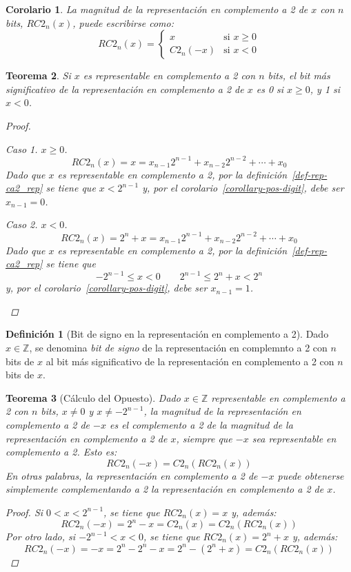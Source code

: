 \documentclass[spanish,a4paper,12pt,titlepage]{article}
\newtheorem{theorem}{Teorema}%
\newtheorem{corollary}[theorem]{Corolario}
\theoremstyle{definition}
\newtheorem{definition}{Definición}%
\theoremstyle{remark}
\newtheorem{case}{Caso}
\newcommand{\bbZ}{\mathbb{Z}}
\begin{document}
\begin{corollary}
  La magnitud de la representación en complemento a 2 de $x$ con $n$ bits, $RC2_n(x)$, puede escribirse como:
  \[
    RC2_n(x) = \begin{cases}
      x        & \text{si } x \ge 0\\
      C2_n(-x) & \text{si } x < 0
    \end{cases}
  \]
\end{corollary}

\begin{theorem}\label{theorem-sign-bit}
  Si $x$ es representable en complemento a 2 con $n$ bits, el bit más significativo de la representación en complemento a 2 de $x$ es 0 si $x \ge 0$, y 1 si $x < 0$.
  \begin{proof}
    \begin{case}
      $x \ge 0$.
      \[RC2_n(x)= x = x_{n-1}2^{n-1}+x_{n-2}2^{n-2}+\cdots+x_0\]
      Dado que $x$ es representable en complemento a 2, por la definición~\ref{def-rep-ca2_rep} se tiene que $x<2^{n-1}$ y, por el corolario~\ref{corollary-pos-digit}, debe ser $x_{n-1}=0$.
    \end{case}
    \begin{case}
      $x<0$.
      \[
        RC2_n(x)= 2^n+x = x_{n-1}2^{n-1}+x_{n-2}2^{n-2}+\cdots+x_0
      \]
      Dado que $x$ es representable en complemento a 2, por la definición~\ref{def-rep-ca2_rep} se tiene que
      \[
        -2^{n-1} \le x < 0  \qquad 2^{n-1} \le 2^n + x < 2^n
      \]
      y, por el corolario~\ref{corollary-pos-digit}, debe ser $x_{n-1}=1$.
    \end{case}
  \end{proof}
\end{theorem}

\begin{definition}[Bit de signo en la representación en complemento a 2]
  Dado $x \in \bbZ$, se denomina \emph{bit de signo} de la representación en complemnto a 2 con $n$ bits de $x$ al bit más significativo de la representación en complemento a 2 con $n$ bits de $x$.
\end{definition}

\begin{theorem}[Cálculo del Opuesto]
  Dado $x \in \bbZ$ representable en complemento a 2 con $n$ bits, $x \ne 0$ y $x \ne -2^{n-1}$, la magnitud de la representación en complemento a 2 de $-x$ es el complemento a 2 de la magnitud de la representación en complemento a 2 de $x$, siempre que $-x$ sea representable en complemento a 2. Esto es:
  \[RC2_n(-x) = C2_n(RC2_n(x))\]
  En otras palabras, la representación en complemento a 2 de $-x$ puede obtenerse simplemente complementando a 2 la representación en complemento a 2 de $x$.

  \begin{proof}
    Si $0<x<2^{n-1}$, se tiene que $RC2_n(x)=x$ y, además:
    \[
      RC2_n(-x) = 2^n - x = C2_n(x) = C2_n(RC2_n(x))
    \]
    Por otro lado, si $-2^{n-1}<x<0$, se tiene que $RC2_n(x)=2^n+x$ y, además:
    \[
      RC2_n(-x) = -x = 2^n - 2^n - x = 2^n - (2^n+x) = C2_n(RC2_n(x))
    \]
  \end{proof}
\end{theorem}
\end{document}
